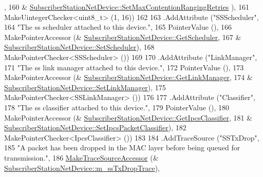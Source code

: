 \begin{DoxyCode}
      ,
160                                          &
      \hyperlink{classns3_1_1SubscriberStationNetDevice_a9773a4526d49df1e45a2ef73fef52d08}{SubscriberStationNetDevice::SetMaxContentionRangingRetries}
      ),
161                    MakeUintegerChecker<uint8\_t> (1, 16))
162 
163     .AddAttribute (\textcolor{stringliteral}{"SSScheduler"},
164                    \textcolor{stringliteral}{"The ss scheduler attached to this device."},
165                    PointerValue (),
166                    MakePointerAccessor (&
      \hyperlink{classns3_1_1SubscriberStationNetDevice_a5a1914c1380b84087a6ec824900dbb38}{SubscriberStationNetDevice::GetScheduler},
167                                         &
      \hyperlink{classns3_1_1SubscriberStationNetDevice_a5735241f5c5aff33d26756b6ecf0aad2}{SubscriberStationNetDevice::SetScheduler}),
168                    MakePointerChecker<SSScheduler> ())
169 
170     .AddAttribute (\textcolor{stringliteral}{"LinkManager"},
171                    \textcolor{stringliteral}{"The ss link manager attached to this device."},
172                    PointerValue (),
173                    MakePointerAccessor (&
      \hyperlink{classns3_1_1SubscriberStationNetDevice_abd6cc1e645a5e7a84ea37a997fdfcea7}{SubscriberStationNetDevice::GetLinkManager},
174                                         &
      \hyperlink{classns3_1_1SubscriberStationNetDevice_abf4511ae0cb9baaad9e12102287dd9c4}{SubscriberStationNetDevice::SetLinkManager}),
175                    MakePointerChecker<SSLinkManager> ())
176 
177     .AddAttribute (\textcolor{stringliteral}{"Classifier"},
178                    \textcolor{stringliteral}{"The ss classifier attached to this device."},
179                    PointerValue (),
180                    MakePointerAccessor (&
      \hyperlink{classns3_1_1SubscriberStationNetDevice_ab16ae477949fafaf132bfe2d8fb8f3cc}{SubscriberStationNetDevice::GetIpcsClassifier},
181                                         &
      \hyperlink{classns3_1_1SubscriberStationNetDevice_a3b4eaebe60f48b6d75e4d487bb036989}{SubscriberStationNetDevice::SetIpcsPacketClassifier}),
182                    MakePointerChecker<IpcsClassifier> ())
183 
184     .AddTraceSource (\textcolor{stringliteral}{"SSTxDrop"},
185                      \textcolor{stringliteral}{"A packet has been dropped in the MAC layer before being queued for transmission."},
186                      \hyperlink{group__tracing_gab21a770b9855af4e8f69f7531ea4a6b0}{MakeTraceSourceAccessor} (&
      \hyperlink{classns3_1_1SubscriberStationNetDevice_a8eb77ccf96f4d45b40bc9498be58df47}{SubscriberStationNetDevice::m\_ssTxDropTrace}),

\end{DoxyCode}
